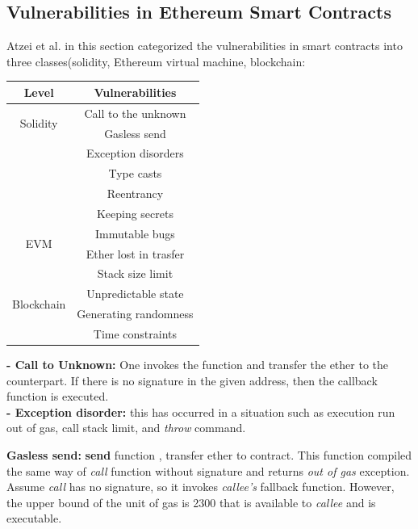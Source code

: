 \subsection{Vulnerabilities in Ethereum Smart Contracts}

Atzei et al. in this section categorized the vulnerabilities in smart contracts into three classes(solidity, Ethereum virtual machine, blockchain:\\
\begin{center}
	\begin{tabular}{c |c }
		\hline
		Level & Vulnerabilities \\
		\hline
		\multirow{2}{4em}{Solidity} & Call to the unknown \\ & Gasless send \\ & Exception disorders  \\ & Type casts \\ & Reentrancy \\ & Keeping secrets \\
		\hline 
		\multirow{2}{4em}{EVM}& Immutable bugs \\ & Ether lost in trasfer \\ & Stack size limit \\
		\hline  
		\multirow{2}{4em}{Blockchain} & Unpredictable state \\ & Generating randomness \\ & Time constraints \\
		\hline
	\end{tabular}     
	
\end{center}

\textbf{- Call to Unknown:} One invokes the function and transfer the ether to the counterpart. If there is no signature in the given address, then the callback function is executed.\\ 

\textbf{- Exception disorder: } this has occurred in a situation such as execution run out of gas, call stack limit, and \textit{throw} command.

\textbf{Gasless send: }\textbf{send} function , transfer ether to contract. This function compiled the same way of \textit{call }function without signature and returns \textit{out of gas} exception.\\
Assume \textit{call} has no signature, so it invokes \textit{callee's } fallback  function. However, the upper bound of the unit of gas is 2300 that is available to \textit{callee } and is executable.

